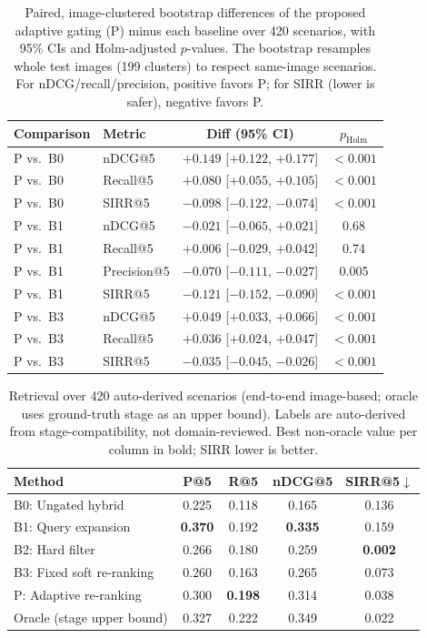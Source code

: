 \documentclass[conference]{IEEEtran}
\begin{document}
\begin{table}[t]
\centering
\caption{Paired, image-clustered bootstrap differences of the proposed adaptive gating (P) minus each baseline over 420 scenarios, with 95\% CIs and Holm-adjusted $p$-values. The bootstrap resamples whole test images (199 clusters) to respect same-image scenarios. For nDCG/recall/precision, positive favors P; for SIRR (lower is safer), negative favors P.}
\label{tab:retrsig}
\small
\begin{tabular}{llcc}
\toprule
\textbf{Comparison} & \textbf{Metric} & \textbf{Diff (95\% CI)} & \textbf{$p_{\text{Holm}}$} \\
\midrule
P vs.\ B0 & nDCG@5 & $+0.149$ [$+0.122$, $+0.177$] & $<0.001$ \\
P vs.\ B0 & Recall@5 & $+0.080$ [$+0.055$, $+0.105$] & $<0.001$ \\
P vs.\ B0 & SIRR@5 & $-0.098$ [$-0.122$, $-0.074$] & $<0.001$ \\
\addlinespace
P vs.\ B1 & nDCG@5 & $-0.021$ [$-0.065$, $+0.021$] & 0.68 \\
P vs.\ B1 & Recall@5 & $+0.006$ [$-0.029$, $+0.042$] & 0.74 \\
P vs.\ B1 & Precision@5 & $-0.070$ [$-0.111$, $-0.027$] & 0.005 \\
P vs.\ B1 & SIRR@5 & $-0.121$ [$-0.152$, $-0.090$] & $<0.001$ \\
\addlinespace
P vs.\ B3 & nDCG@5 & $+0.049$ [$+0.033$, $+0.066$] & $<0.001$ \\
P vs.\ B3 & Recall@5 & $+0.036$ [$+0.024$, $+0.047$] & $<0.001$ \\
P vs.\ B3 & SIRR@5 & $-0.035$ [$-0.045$, $-0.026$] & $<0.001$ \\
\bottomrule
\end{tabular}
\end{table}

\begin{table}[t]
\centering
\caption{Retrieval over 420 auto-derived scenarios (end-to-end image-based; oracle uses ground-truth stage as an upper bound). Labels are auto-derived from stage-compatibility, not domain-reviewed. Best non-oracle value per column in bold; SIRR lower is better.}
\label{tab:retrieval}
\small
\begin{tabular}{lcccc}
\toprule
\textbf{Method} & \textbf{P@5} & \textbf{R@5} & \textbf{nDCG@5} & \textbf{SIRR@5}$\downarrow$ \\
\midrule
B0: Ungated hybrid & 0.225 & 0.118 & 0.165 & 0.136 \\
B1: Query expansion & \textbf{0.370} & 0.192 & \textbf{0.335} & 0.159 \\
B2: Hard filter & 0.266 & 0.180 & 0.259 & \textbf{0.002} \\
B3: Fixed soft re-ranking & 0.260 & 0.163 & 0.265 & 0.073 \\
P: Adaptive re-ranking & 0.300 & \textbf{0.198} & 0.314 & 0.038 \\
\midrule
Oracle (stage upper bound) & 0.327 & 0.222 & 0.349 & 0.022 \\
\bottomrule
\end{tabular}
\end{table}
\end{document}

